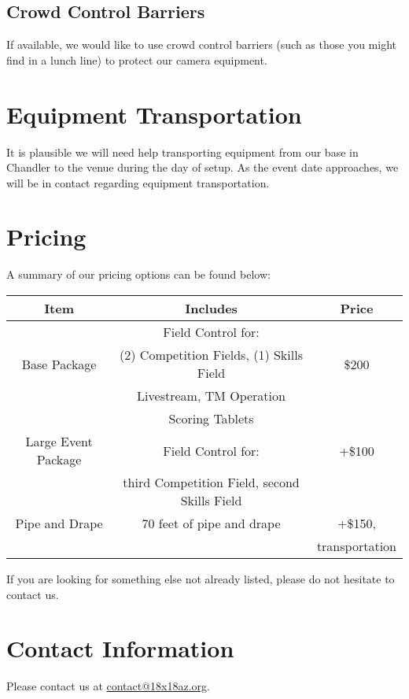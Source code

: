 \documentclass[12pt]{article}
\begin{document}
\subsection{Crowd Control Barriers}
If available, we would like to use crowd control barriers (such as those you might find in a lunch line) to protect our camera equipment.

\section{Equipment Transportation}
It is plausible we will need help transporting equipment from our base in Chandler to the venue during the day of setup.
As the event date approaches, we will be in contact regarding equipment transportation.

\section{Pricing}
A summary of our pricing options can be found below:
\begin{center}
    \begin{tabular}{|c|c|c|}
        \hline
        \textbf{Item} & \textbf{Includes} & \textbf{Price} \\
        \hline
                 & Field Control for:    &  \\
        Base Package & (2) Competition Fields, (1) Skills Field         & \$200 \\
                 & Livestream, TM Operation & \\
                 & Scoring Tablets          & \\
        \hline
        Large Event Package & Field Control for: & +\$100 \\
        & third Competition Field, second Skills Field & \\
        \hline
        Pipe and Drape & 70 feet of pipe and drape & +\$150, \\
                       & & transportation \\
        \hline
    \end{tabular}
\end{center}
If you are looking for something else not already listed, please do not hesitate to contact us.

\section{Contact Information}
Please contact us at \href{mailto:contact@18x18az.org}{contact@18x18az.org}.
\end{document}
